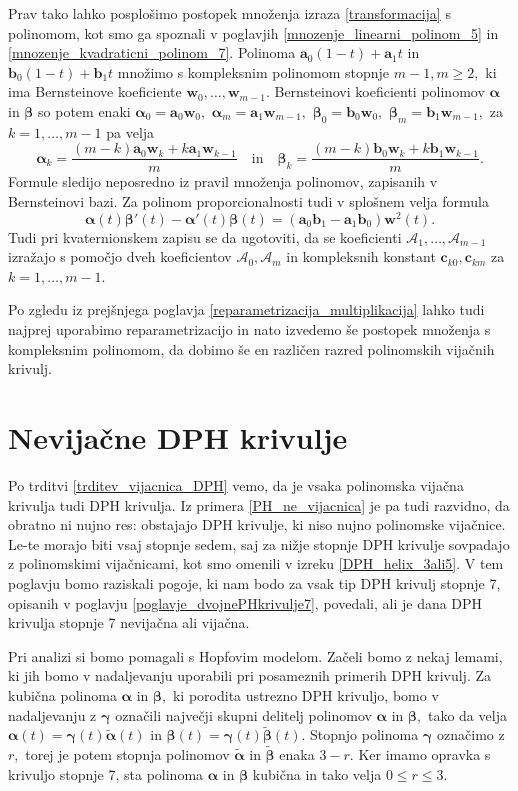 \documentclass[12pt,a4paper,twoside]{article}
\theoremstyle{definition} %
\theoremstyle{plain} %
\theoremstyle{primerstyle}
\numberwithin{equation}{section}  %
\newcommand{\aV}{\mathbf{a}}
\newcommand{\bV}{\mathbf{b}}
\newcommand{\cV}{\mathbf{c}}
\newcommand{\wV}{\mathbf{w}}
\newcommand{\AQ}{\mathcal{A}}
\newcommand{\balpha}{\boldsymbol \alpha}
\newcommand{\bbeta}{\boldsymbol \beta}
\newcommand{\bgamma}{\boldsymbol \gamma}
\newcommand{\btalpha}{\tilde{\boldsymbol \alpha}}
\newcommand{\btbeta}{\tilde{\boldsymbol \beta}}
\begin{document}
Prav tako lahko posplošimo postopek množenja izraza \eqref{transformacija} s polinomom, kot smo ga spoznali v poglavjih \ref{mnozenje_linearni_polinom_5} in \ref{mnozenje_kvadraticni_polinom_7}. Polinoma $\aV_0(1-t)+\aV_1t$ in $\bV_0(1-t)+\bV_1t$ množimo s kompleksnim polinomom stopnje $m-1,m\geq2,$ ki ima Bernsteinove koeficiente $\wV_0,\dots,\wV_{m-1}.$ Bernsteinovi koeficienti polinomov $\balpha$ in $\bbeta$ so potem enaki $\balpha_0=\aV_0\wV_0,$ $\balpha_m=\aV_1\wV_{m-1},$ $\bbeta_0=\bV_0\wV_0,$ $\bbeta_m=\bV_1\wV_{m-1},$ za $k=1,\dots,m-1$ pa velja
\begin{equation*}
	\balpha_k=\frac{(m-k)\aV_0\wV_k+k\aV_1\wV_{k-1}}{m}\quad\text{in}\quad\bbeta_k=\frac{(m-k)\bV_0\wV_k+k\bV_1\wV_{k-1}}{m}.
\end{equation*}
Formule sledijo neposredno iz pravil množenja polinomov, zapisanih v Bernsteinovi bazi. Za polinom proporcionalnosti tudi v splošnem velja formula $$\balpha(t)\bbeta'(t)-\balpha'(t)\bbeta(t)=(\aV_0\bV_1-\aV_1\bV_0)\wV^2(t).$$ Tudi pri kvaternionskem zapisu se da ugotoviti, da se koeficienti $\AQ_1,\dots,\AQ_{m-1}$ izražajo s pomočjo dveh koeficientov $\AQ_0,\AQ_m$ in kompleksnih konstant $\cV_{k0},\cV_{km}$ za $k=1,\dots,m-1.$

Po zgledu iz prejšnjega poglavja \ref{reparametrizacija_multiplikacija} lahko tudi najprej uporabimo reparametrizacijo in nato izvedemo še postopek množenja s kompleksnim polinomom, da dobimo še en različen razred polinomskih vijačnih krivulj.
\clearpage

\section{Nevijačne DPH krivulje}
\label{poglavje_nevijacne}

Po trditvi \ref{trditev_vijacnica_DPH} vemo, da je vsaka polinomska vijačna krivulja tudi DPH krivulja. Iz primera \ref{PH_ne_vijacnica} je pa tudi razvidno, da obratno ni nujno res: obstajajo DPH krivulje, ki niso nujno polinomske vijačnice. Le-te morajo biti vsaj stopnje sedem, saj za nižje stopnje DPH krivulje sovpadajo z polinomskimi vijačnicami, kot smo omenili v izreku \ref{DPH_helix_3ali5}. %
V tem poglavju bomo raziskali pogoje, ki nam bodo za vsak tip DPH krivulj stopnje 7, opisanih v poglavju \ref{poglavje_dvojnePHkrivulje7}, povedali, ali je dana DPH krivulja stopnje 7 nevijačna ali vijačna.

Pri analizi si bomo pomagali s Hopfovim modelom. Začeli bomo z nekaj lemami, ki jih bomo v nadaljevanju uporabili pri posameznih primerih DPH krivulj. Za kubična polinoma $\balpha$ in $\bbeta,$ ki porodita ustrezno DPH krivuljo, bomo v nadaljevanju z $\bgamma$ označili največji skupni delitelj polinomov $\balpha$ in $\bbeta,$ tako da velja $\balpha(t)=\bgamma(t)\btalpha(t)$ in $\bbeta(t)=\bgamma(t)\btbeta(t).$ Stopnjo polinoma $\bgamma$ označimo z $r,$ torej je potem stopnja polinomov $\btalpha$ in $\btbeta$ enaka $3-r.$ Ker imamo opravka s krivuljo stopnje 7, sta polinoma $\balpha$ in $\bbeta$ kubična in tako velja $0\leq r \leq 3.$
\end{document}

